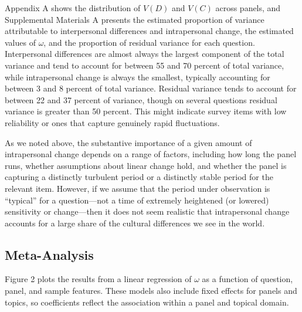 \documentclass[
  12pt,
]{article}
\begin{document}
Appendix A shows the distribution of \(V(D)\) and \(V(C)\) across
panels, and Supplemental Materials A presents the estimated proportion
of variance attributable to interpersonal differences and intrapersonal
change, the estimated values of \(\omega\), and the proportion of
residual variance for each question. Interpersonal differences are
almost always the largest component of the total variance and tend to
account for between 55 and 70 percent of total variance, while
intrapersonal change is always the smallest, typically accounting for
between 3 and 8 percent of total variance. Residual variance tends to
account for between 22 and 37 percent of variance, though on several
questions residual variance is greater than 50 percent. This might
indicate survey items with low reliability or ones that capture
genuinely rapid fluctuations.

As we noted above, the substantive importance of a given amount of
intrapersonal change depends on a range of factors, including how long
the panel runs, whether assumptions about linear change hold, and
whether the panel is capturing a distinctly turbulent period or a
distinctly stable period for the relevant item. However, if we assume
that the period under observation is ``typical'' for a question---not a
time of extremely heightened (or lowered) sensitivity or change---then
it does not seem realistic that intrapersonal change accounts for a
large share of the cultural differences we see in the world.

\hypertarget{meta-analysis}{%
\subsection{Meta-Analysis}\label{meta-analysis}}

Figure 2 plots the results from a linear regression of \(\omega\) as a
function of question, panel, and sample features. These models also
include fixed effects for panels and topics, so coefficients reflect the
association within a panel and topical domain.
\end{document}
